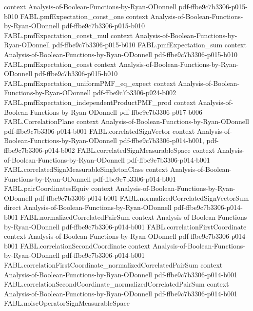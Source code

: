 \begin{theorem}
  {context}
  {Analysis-of-Boolean-Functions-by-Ryan-ODonnell}
  {pdf-ffbe9c7b3306-p015-b010}
\proofstep
  {FABL.pmfExpectation_const_one}
  {context}
  {Analysis-of-Boolean-Functions-by-Ryan-ODonnell}
  {pdf-ffbe9c7b3306-p015-b010}
\proofstep
  {FABL.pmfExpectation_const_mul}
  {context}
  {Analysis-of-Boolean-Functions-by-Ryan-ODonnell}
  {pdf-ffbe9c7b3306-p015-b010}
\proofstep
  {FABL.pmfExpectation_sum}
  {context}
  {Analysis-of-Boolean-Functions-by-Ryan-ODonnell}
  {pdf-ffbe9c7b3306-p015-b010}
\proofstep
  {FABL.pmfExpectation_const}
  {context}
  {Analysis-of-Boolean-Functions-by-Ryan-ODonnell}
  {pdf-ffbe9c7b3306-p015-b010}
\proofstep
  {FABL.pmfExpectation_uniformPMF_eq_expect}
  {context}
  {Analysis-of-Boolean-Functions-by-Ryan-ODonnell}
  {pdf-ffbe9c7b3306-p024-b002}
\proofstep
  {FABL.pmfExpectation_independentProductPMF_prod}
  {context}
  {Analysis-of-Boolean-Functions-by-Ryan-ODonnell}
  {pdf-ffbe9c7b3306-p017-b006}
\proofstep
  {FABL.CorrelationPlane}
  {context}
  {Analysis-of-Boolean-Functions-by-Ryan-ODonnell}
  {pdf-ffbe9c7b3306-p014-b001}
\proofstep
  {FABL.correlatedSignVector}
  {context}
  {Analysis-of-Boolean-Functions-by-Ryan-ODonnell}
  {pdf-ffbe9c7b3306-p014-b001,
    pdf-ffbe9c7b3306-p014-b002}
\proofstep
  {FABL.correlatedSignMeasurableSpace}
  {context}
  {Analysis-of-Boolean-Functions-by-Ryan-ODonnell}
  {pdf-ffbe9c7b3306-p014-b001}
\proofstep
  {FABL.correlatedSignMeasurableSingletonClass}
  {context}
  {Analysis-of-Boolean-Functions-by-Ryan-ODonnell}
  {pdf-ffbe9c7b3306-p014-b001}
\proofstep
  {FABL.pairCoordinatesEquiv}
  {context}
  {Analysis-of-Boolean-Functions-by-Ryan-ODonnell}
  {pdf-ffbe9c7b3306-p014-b001}
\proofstep
  {FABL.normalizedCorrelatedSignVectorSum}
  {direct}
  {Analysis-of-Boolean-Functions-by-Ryan-ODonnell}
  {pdf-ffbe9c7b3306-p014-b001}
\proofstep
  {FABL.normalizedCorrelatedPairSum}
  {context}
  {Analysis-of-Boolean-Functions-by-Ryan-ODonnell}
  {pdf-ffbe9c7b3306-p014-b001}
\proofstep
  {FABL.correlationFirstCoordinate}
  {context}
  {Analysis-of-Boolean-Functions-by-Ryan-ODonnell}
  {pdf-ffbe9c7b3306-p014-b001}
\proofstep
  {FABL.correlationSecondCoordinate}
  {context}
  {Analysis-of-Boolean-Functions-by-Ryan-ODonnell}
  {pdf-ffbe9c7b3306-p014-b001}
\proofstep
  {FABL.correlationFirstCoordinate_normalizedCorrelatedPairSum}
  {context}
  {Analysis-of-Boolean-Functions-by-Ryan-ODonnell}
  {pdf-ffbe9c7b3306-p014-b001}
\proofstep
  {FABL.correlationSecondCoordinate_normalizedCorrelatedPairSum}
  {context}
  {Analysis-of-Boolean-Functions-by-Ryan-ODonnell}
  {pdf-ffbe9c7b3306-p014-b001}
\proofstep
  {FABL.noiseOperatorSignMeasurableSpace}

\end{theorem}
